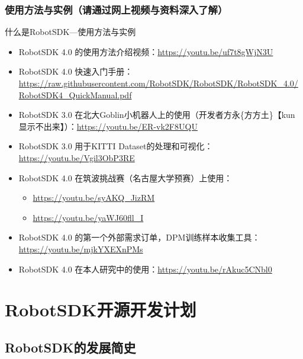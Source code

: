 \documentclass[9pt]{beamer}
\begin{document}
	\subsubsection{使用方法与实例（请通过网上视频与资料深入了解）}
	\begin{frame}{什么是RobotSDK---使用方法与实例}
		\begin{itemize}
			\item RobotSDK 4.0 的使用方法介绍视频：\url{https://youtu.be/uf7t8gWjN3U}
			\item RobotSDK 4.0 快速入门手册： \url{https://raw.githubusercontent.com/RobotSDK/RobotSDK/RobotSDK_4.0/RobotSDK4_QuickManual.pdf}
			\item RobotSDK 3.0 在北大Goblin小机器人上的使用（开发者方永\{方方土\}【kun显示不出来】）：\url{https://youtu.be/ER-vk2F8UQU}
			\item RobotSDK 3.0 用于KITTI Dataset的处理和可视化：\url{https://youtu.be/Vgil3ObP3RE}
			\item RobotSDK 4.0 在筑波挑战赛（名古屋大学预赛）上使用：
			\begin{itemize}
				\item \url{https://youtu.be/syAKQ_JizRM}
				\item \url{https://youtu.be/yaWJ60fll_I}
			\end{itemize}
			\item RobotSDK 4.0 的第一个外部需求订单，DPM训练样本收集工具：\url{https://youtu.be/mjkYXEXnPMs}
			\item RobotSDK 4.0 在本人研究中的使用：\url{https://youtu.be/rAkuc5CNbl0}
		\end{itemize}
	\end{frame}
	
	\section{RobotSDK开源开发计划}
	\subsection{RobotSDK的发展简史}
\end{document}
